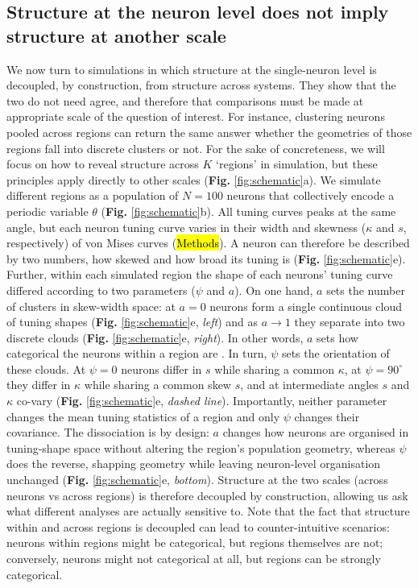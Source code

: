 \subsection{Structure at the neuron level does not imply structure at another scale}


We now turn to simulations in which structure at the single-neuron level is decoupled, by construction, from structure across systems. They show that the two do not need agree, and therefore that comparisons must be made at appropriate scale of the question of interest. For instance, clustering neurons pooled across regions can return the same answer whether the geometries of those regions fall into discrete clusters or not. For the sake of concreteness, we will focus on how to reveal structure across $K$ `regions' in simulation, but these principles apply directly to other scales (\textbf{Fig.} \ref{fig:schematic}a). We simulate different regions as a population of $N = 100$ neurons that collectively encode a periodic variable $\theta$ (\textbf{Fig.} \ref{fig:schematic}b). All tuning curves peaks at the same angle, but each neuron tuning curve varies in their width and skewness ($\kappa$ and $s$, respectively) of von Mises curves (\hl{Methods}). A neuron can therefore be described by two numbers, how skewed and how broad its tuning is (\textbf{Fig.} \ref{fig:schematic}e). Further, within each simulated region the shape of each neurons' tuning curve differed according to two parameters ($\psi$ and $a$). On one hand, $a$ sets the number of clusters in skew-width space: at $a = 0$ neurons form a single continuous cloud of tuning shapes (\textbf{Fig. }\ref{fig:schematic}e, \textit{left}) and as $a \to 1$ they separate into two discrete clouds (\textbf{Fig.} \ref{fig:schematic}e, \textit{right}). In other words, $a$ sets how categorical the neurons within a region are \parencite{posani2026}. In turn, $\psi$ sets the orientation of these clouds.  At $\psi = 0$ neurons differ in $s$ while sharing a common $\kappa$, at $\psi = 90^\circ$ they differ in $\kappa$ while sharing a common skew $s$, and at intermediate angles $s$ and $\kappa$ co-vary (\textbf{Fig. }\ref{fig:schematic}e, \textit{dashed line}). Importantly, neither parameter changes the mean tuning statistics of a region and only $\psi$ changes their covariance. The dissociation is by design: $a$ changes how neurons are organised in tuning-shape space without altering the region's population geometry, whereas $\psi$ does the reverse, shapping  geometry \parencite{harvey2024duality} while leaving neuron-level organisation unchanged (\textbf{Fig.} \ref{fig:schematic}e, \textit{bottom}). Structure at the two scales (across neurons vs across regions) is therefore decoupled by construction, allowing us ask what different analyses are actually sensitive to. Note that the fact that structure within and across regions is decoupled can lead to counter-intuitive scenarios: neurons within regions might be categorical, but regions themselves are not; conversely, neurons might not categorical at all, but regions can be strongly categorical.

